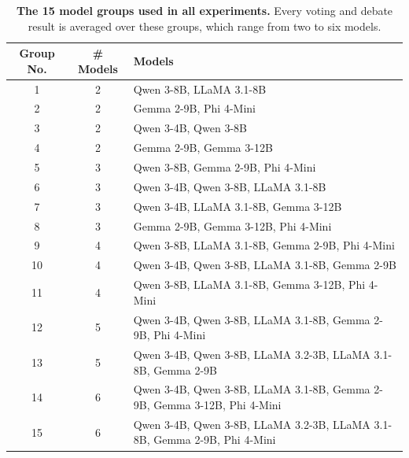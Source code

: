 \begin{table}[t]
\centering
\small
\begin{tabular}{c|c|l}
\toprule
\textbf{Group No.} & \textbf{\# Models} & \textbf{Models} \\
\midrule
1  & 2 & Qwen 3-8B, LLaMA 3.1-8B \\
2  & 2 & Gemma 2-9B, Phi 4-Mini \\
3  & 2 & Qwen 3-4B, Qwen 3-8B \\
4  & 2 & Gemma 2-9B, Gemma 3-12B \\
\midrule
5  & 3 & Qwen 3-8B, Gemma 2-9B, Phi 4-Mini \\
6  & 3 & Qwen 3-4B, Qwen 3-8B, LLaMA 3.1-8B \\
7  & 3 & Qwen 3-4B, LLaMA 3.1-8B, Gemma 3-12B \\
8  & 3 & Gemma 2-9B, Gemma 3-12B, Phi 4-Mini \\
\midrule
9  & 4 & Qwen 3-8B, LLaMA 3.1-8B, Gemma 2-9B, Phi 4-Mini \\
10 & 4 & Qwen 3-4B, Qwen 3-8B, LLaMA 3.1-8B, Gemma 2-9B \\
11 & 4 & Qwen 3-8B, LLaMA 3.1-8B, Gemma 3-12B, Phi 4-Mini \\
\midrule
12 & 5 & Qwen 3-4B, Qwen 3-8B, LLaMA 3.1-8B, Gemma 2-9B, Phi 4-Mini \\
13 & 5 & Qwen 3-4B, Qwen 3-8B, LLaMA 3.2-3B, LLaMA 3.1-8B, Gemma 2-9B \\
\midrule
14 & 6 & Qwen 3-4B, Qwen 3-8B, LLaMA 3.1-8B, Gemma 2-9B, Gemma 3-12B, Phi 4-Mini \\
15 & 6 & Qwen 3-4B, Qwen 3-8B, LLaMA 3.2-3B, LLaMA 3.1-8B, Gemma 2-9B, Phi 4-Mini \\
\bottomrule
\end{tabular}
\caption{\textbf{The 15 model groups used in all experiments.} Every voting and debate result is averaged over these groups, which range from two to six models.}
\label{tab:model_groups}
\end{table}
